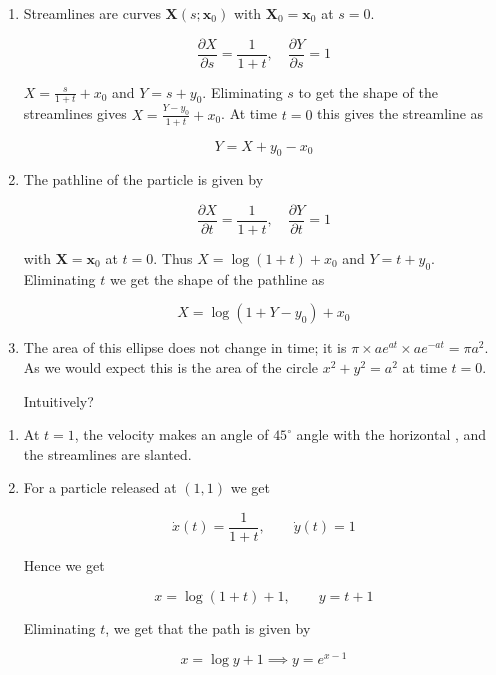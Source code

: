 \documentclass[a4paper]{article}
\begin{document}
\begin{enumerate}
	\item Streamlines are curves $ \mathbf{X}(s; \mathbf{x}_{0}) $ with $ \mathbf{X}_{0} = \mathbf{x}_{0} $ at $ s = 0 $. 
	
	\[ \frac{\partial X }{\partial s} = \frac{1}{1+t}, \quad \frac{\partial Y }{\partial s} = 1 \]
	
	$ X = \frac{s}{1+t} + x_{0} $ and $ Y = s + y_{0} $. Eliminating $ s $ to get the shape of the streamlines gives $ X = \frac{Y - y_{0}}{1+t} + x_{0} $. At time $ t = 0 $ this gives the streamline as
	
	\[ Y = X + y_{0} - x_{0} \]
	
	
	
	\item The pathline of the particle is given by
	
	\[ \frac{\partial X }{\partial t} = \frac{1}{1+t}, \quad \frac{\partial Y }{\partial t} = 1 \]
	
	with $ \mathbf{X} = \mathbf{x}_{0} $ at $ t = 0 $. Thus $ X = \log(1+t) + x_{0} $ and $ Y = t + y_{0} $. Eliminating $ t $ we get the shape of the pathline as
	
	\[ X = \log(1+ Y - y_{0}) + x_{0} \]
	
	
	
	\item 
	
	The area of this ellipse does not change in time; it is $ \pi \times ae^{at} \times ae^{-at} = \pi a^{2} $. As we would expect this is the area of the circle $ x^{2} + y^{2} = a^{2} $ at time $ t = 0 $. 
	
	Intuitively?
	
	
\end{enumerate}


















\begin{enumerate}
	\item At $ t = 1 $, the velocity makes an angle of $ 45^\circ $ angle with the horizontal , and the streamlines are slanted.
	
	\item For a particle released at $ (1,1) $ we get
	
	\[ \dot{x}(t) = \frac{1}{1+t}, \qquad \dot{y}(t) = 1  \]
	
	Hence we get 
	
	\[ x = \log(1+t) + 1, \qquad y = t + 1 \]
	
	Eliminating $ t $, we get that the path is given by
	
	\[ x = \log y + 1 \implies y = e^{x-1} \]
	
	
	
\end{enumerate}
\end{document}
